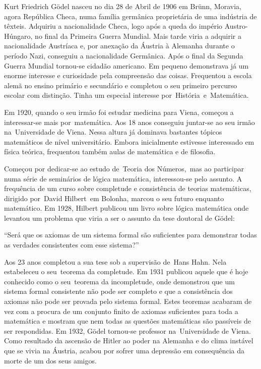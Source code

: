 \documentclass{article}
\begin{document}
\begin{multicols}{3}
    \newpage
Kurt Friedrich Gödel nasceu no dia 28 de Abril de 1906 em Brünn, Moravia, agora República Checa, numa família germânica proprietária de uma indústria de têxteis. Adquiriu a nacionalidade Checa, logo após a queda do império Austro-Húngaro, no final da Primeira Guerra Mundial. Mais tarde viria a adquirir a nacionalidade Austríaca e, por anexação da Áustria à Alemanha durante o período Nazi, conseguiu a nacionalidade Germânica. Após o final da Segunda Guerra Mundial tornou-se cidadão americano.
Em pequeno demonstrava já um enorme interesse e curiosidade pela compreensão das coisas. Frequentou a escola alemã no ensino primário e secundário e completou o seu primeiro percurso escolar com distinção. Tinha um especial interesse por História e Matemática.

Em 1920, quando o seu irmão foi estudar medicina para Viena, começou a interessar-se mais por matemática. Aos 18 anos conseguiu juntar-se ao seu irmão na Universidade de Viena. Nessa altura já dominava bastantes tópicos matemáticos de nível universitário. Embora inicialmente estivesse interessado em física teórica, frequentou também aulas de matemática e de filosofia. 

Começou por dedicar-se ao estudo de Teoria dos Números, mas ao participar numa série de seminários de lógica matemática, interessou-se pelo assunto.
A frequência de um curso sobre completude e consistência de teorias matemáticas, dirigido por David Hilbert em Bolonha, marcou o seu futuro enquanto matemático. Em 1928, Hilbert publicou um livro sobre lógica matemática onde levantou um problema que viria a ser o assunto da tese doutoral de Gödel:

“Será que os axiomas de um sistema formal são suficientes para demonstrar todas as verdades consistentes com esse sistema?”

Aos 23 anos completou a sua tese sob a supervisão de Hans Hahn. Nela estabeleceu o seu teorema da completude. Em 1931 publicou aquele que é hoje conhecido como o seu teorema da incompletude, onde demonstrou que um sistema formal consistente não pode ser completo e que a consistência dos axiomas não pode ser provada pelo sistema formal. Estes teoremas acabaram de vez com a procura de um conjunto finito de axiomas suficientes para toda a matemática e mostram que nem todas as questões matemáticas são passíveis de ser respondidas.
Em 1932, Gödel tornou-se professor na Universidade de Viena. Como resultado da ascensão de Hitler ao poder na Alemanha e do clima instável que se vivia na Áustria, acabou por sofrer uma depressão em consequência da morte de um dos seus amigos.


\end{multicols}
\end{document}
